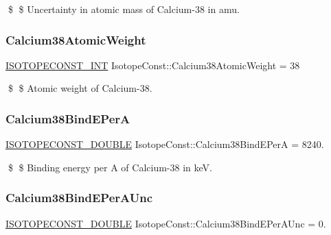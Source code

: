 \$ \$ Uncertainty in atomic mass of Calcium-\/38 in amu. \mbox{\label{group___isotope_const-_calcium-_ca38_ga194d9fbd5e2575b1aede62ac6f956044}} 
\subsubsection{\texorpdfstring{Calcium38\+Atomic\+Weight}{Calcium38AtomicWeight}}
{\footnotesize\ttfamily \mbox{\hyperlink{group___isotope_const-_macros_ga5f18360b3e99483a35c32d789e62621c}{I\+S\+O\+T\+O\+P\+E\+C\+O\+N\+S\+T\+\_\+\+I\+NT}} Isotope\+Const\+::\+Calcium38\+Atomic\+Weight = 38}

\$ \$ Atomic weight of Calcium-\/38. \mbox{\label{group___isotope_const-_calcium-_ca38_gad2ab6423ce1a6e63fa08a3702771e65a}} 
\subsubsection{\texorpdfstring{Calcium38\+Bind\+E\+PerA}{Calcium38BindEPerA}}
{\footnotesize\ttfamily \mbox{\hyperlink{group___isotope_const-_macros_ga8f45a7272ce02c0b4c65c44636ed719a}{I\+S\+O\+T\+O\+P\+E\+C\+O\+N\+S\+T\+\_\+\+D\+O\+U\+B\+LE}} Isotope\+Const\+::\+Calcium38\+Bind\+E\+PerA = 8240.}

\$ \$ Binding energy per A of Calcium-\/38 in keV. \mbox{\label{group___isotope_const-_calcium-_ca38_ga4e5a277534ad01f925854345b1f3754f}} 
\subsubsection{\texorpdfstring{Calcium38\+Bind\+E\+Per\+A\+Unc}{Calcium38BindEPerAUnc}}
{\footnotesize\ttfamily \mbox{\hyperlink{group___isotope_const-_macros_ga8f45a7272ce02c0b4c65c44636ed719a}{I\+S\+O\+T\+O\+P\+E\+C\+O\+N\+S\+T\+\_\+\+D\+O\+U\+B\+LE}} Isotope\+Const\+::\+Calcium38\+Bind\+E\+Per\+A\+Unc = 0.}

